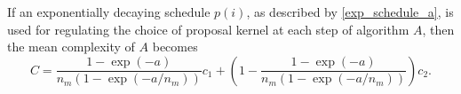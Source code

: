 \documentclass[twoside,11pt]{article}
\begin{document}
\begin{proposition}
If an exponentially decaying schedule $p(i)$, as described by \eqref{exp_schedule_a}, is used for regulating the choice of 
proposal kernel at each step of algorithm $A$, then the mean complexity of $A$ becomes
\begin{equation}
C=
\dfrac{1-\exp{(-a)}}{n_m(1-\exp{(-a/n_m)})}c_1+
\left(1-\dfrac{1-\exp{(-a)}}{n_m(1-\exp{(-a/n_m)})}\right)c_2.
\end{equation}
\end{proposition}

%
%
%
%
%
%
%
%
%


%
%
%
\end{document}
